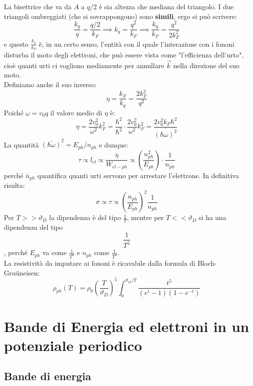 \documentclass{book}
\begin{document}
        La bisettrice che va da $A$ a $q/2$ è sia altezza che mediana del triangolo. I due triangoli ombreggiati (che si sovrappongono) sono \textbf\textbf{simili}, ergo si può scrivere:
        $$\frac{k_{q}}{q} = \frac{q/2}{k_{F}} \implies k_{q} = \frac{q^{2}}{k_{F}} \implies \frac{k_{q}}{k_{F}} = \frac{q^{2}}{2k_{F} ^{2}}$$
        e questo $\displaystyle \frac{k_{q}}{k_{F}}$ è, in un certo senso, l'entità con il quale l'interazione con i fononi disturba il moto degli elettroni, che può essere vista come "l'efficienza dell'urto", cioè quanti urti ci vogliono mediamente per annullare $\vec{k}$ nella direzione del suo moto.\\
        Definiamo anche il suo inverso:
        $$\eta = \frac{k_{F}}{k_{q}} = \frac{2k_{F} ^{2}}{q^{2}}$$
        Poiché $\omega = v_{0}q$ il valore medio di $\eta$ è:
        $$\eta = \frac{2v_{0} ^{2}}{\omega ^{2}}k_{F} ^{2} = \frac{\hbar ^{2}}{\hbar ^{2}} \cdot \frac{2v_{0} ^{2}}{\omega ^{2}}k_{F} ^{2} =  \frac{2v_{0} ^{2}k_{F} \hbar ^{2}}{\bar{(\hbar \omega)^{2}}}$$
        La quantità $\bar{(\hbar \omega)}^{2} = E_{ph}/n_{ph}$ e dunque:
        $$\tau \propto l_{el} \propto \frac{\bar{\eta}}{W_{el-ph}} \propto (\frac{n_{ph} ^{2}}{E_{ph}}) \cdot \frac{1}{n_{ph}}$$
        perché $\bar{n}_{ph}$ quantifica quanti urti servono per arrestare l'elettrone. In definitiva risulta:
        $$\sigma \propto \tau \propto (\frac{n_{ph}}{E_{ph}})^{2} \frac{1}{n_{ph}}$$
        Per $T>> \vartheta_{D}$ la dipendenza è del tipo $\displaystyle \frac{1}{T}$, mentre per $T<< \vartheta_{D}$ si ha una dipendenza del tipo $$\displaystyle \frac{1}{T^{5}}$$, perché $E_{ph}$ va come $\displaystyle \frac{1}{T^{4}}$ e $n_{ph}$ come $\displaystyle \frac{1}{T^{3}}$.\\
        La resistività da imputare ai fononi è ricavabile dalla formula di Bloch-Gru{\"u}neisen:
        $$\rho_{ph} (T) = \rho_{0} (\frac{T}{\vartheta_{D}}) ^{5} \int_{0} ^{\vartheta_{D}/T} \frac{t^{5}}{(e^{t}-1)(1-e^{-t})}$$
\chapter{Bande di Energia ed elettroni in un potenziale periodico}
    \section{Bande di energia}
\end{document}
